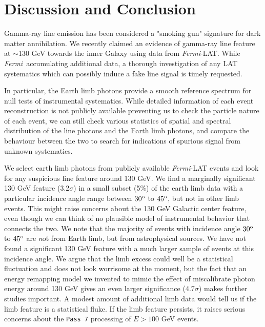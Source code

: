 \documentclass[aps,twocolumn,prd,superscriptaddress,showpacs,nofootinbib,fixfloat]{revtex4}
\newcommand{\Fermi}{{\slshape Fermi}}
\newcommand{\degree}{^{\rm o}}
\begin{document}
\section{Discussion and Conclusion}
\label{sec:Conclusion}

Gamma-ray line emission has been considered a "smoking gun"
signature for dark matter annihilation.  We recently claimed
an evidence of gamma-ray line feature at $\sim$130 GeV
towards the inner Galaxy using data from \Fermi-LAT. While
\Fermi\ accumulating additional data, a thorough
investigation of any LAT systematics which can possibly
induce a fake line signal is timely requested.

In particular, the Earth limb photons provide a smooth
reference spectrum for null tests of instrumental
systematics. While detailed information of each event
reconstruction is not publicly available preventing us to
check the particle nature of each event, we can still check
various statistics of spatial and spectral distribution of
the line photons and the Earth limb photons, and compare the
behaviour between the two to search for indications of
spurious signal from unknown systematics.

We select earth limb photons from publicly available
\Fermi-LAT events and look for any suspicious line feature
around 130 GeV.  We find a marginally significant 130 GeV
feature (3.2$\sigma$) in a small subset (5\%) of the earth
limb data with a particular incidence angle range between
$30\degree$ to $45\degree$, but not in other limb events.  This
might raise concerns about the 130 GeV Galactic center
feature, even though we can think of no plausible model of
instrumental behavior that connects the two.  We note that
the majority of events with incidence angle $30\degree$ to
$45\degree$ are {\emph not} from Earth limb, but from
astrophysical sources. We have not found a significant 130 GeV
feature with a much larger sample of events at this incidence
angle.
We argue that the limb excess could well be a statistical
fluctuation and does not look worrisome at the moment, but
the fact that an energy remapping model we invented to mimic
the effect of miscalibrate photon energy around 130 GeV
gives an even larger significance (4.7$\sigma$) makes
further studies important. A modest amount of additional
limb data would tell us if the limb feature is a statistical
fluke.  If the limb feature persists, it raises serious
concerns about the \texttt{Pass 7} processing of $E > 100$ GeV
events.
\end{document}
